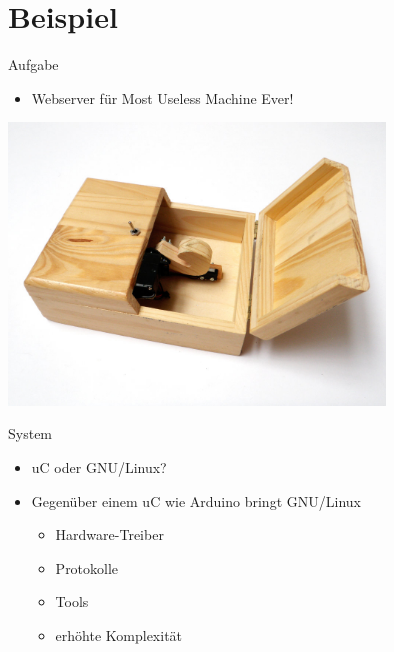 

\section{Beispiel}

\begin{frame}{Aufgabe}
	\begin{itemize}
		\item Webserver für Most Useless Machine Ever!
	\end{itemize}
	\begin{center}
		\includegraphics[width=0.75\textwidth]{res/mume.jpg}
		\cite{mumePic}
	\end{center}
\end{frame}

\begin{frame}{System}
	\begin{itemize}
		\item uC oder GNU/Linux?
		\item Gegenüber einem uC wie Arduino bringt GNU/Linux
		\begin{itemize}
			\item Hardware-Treiber
			\item Protokolle
			\item Tools
			\item erhöhte Komplexität
		\end{itemize}
	\end{itemize}
\end{frame}

